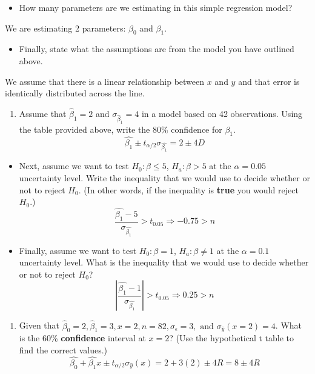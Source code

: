 \documentclass[
]{article}
\providecommand{\tightlist}{%
  \setlength{\itemsep}{0pt}\setlength{\parskip}{0pt}}
\begin{document}
\begin{itemize}
\tightlist
\item
  How many parameters are we estimating in this simple regression model?
\end{itemize}

We are estimating 2 parameters: \(\beta_0\) and \(\beta_1\).

\begin{itemize}
\tightlist
\item
  Finally, state what the assumptions are from the model you have
  outlined above.
\end{itemize}

We assume that there is a linear relationship between \(x\) and \(y\)
and that error is identically distributed across the line.

\begin{enumerate}
\def\labelenumi{\arabic{enumi}.}
\setcounter{enumi}{2}
\tightlist
\item
  Assume that \(\hat{\beta}_1 = 2\) and \(\sigma_{\hat{\beta}_1} = 4\)
  in a model based on 42 observations. Using the table provided above,
  write the 80\% confidence for \(\beta_1\).
  \[\hat{\beta_1}\pm t_{\alpha/2}\sigma_{\hat{\beta_1}}=\boxed{2\pm4D}\]
\end{enumerate}

\begin{itemize}
\tightlist
\item
  Next, assume we want to test \(H_0: \beta \le 5\), \(H_a: \beta > 5\)
  at the \(\alpha = 0.05\) uncertainty level. Write the inequality that
  we would use to decide whether or not to reject \(H_0\). (In other
  words, if the inequality is \textbf{true} you would reject \(H_0\).)
  \[\frac{\hat{\beta_1}-5}{\sigma_{\hat{\beta_1}}}>t_{0.05}\Rightarrow\boxed{-0.75>n}\]
\item
  Finally, assume we want to test \(H_0: \beta = 1\),
  \(H_a: \beta \ne 1\) at the \(\alpha = 0.1\) uncertainty level. What
  is the inequality that we would use to decide whether or not to reject
  \(H_0\)?
  \[\left|\frac{\hat{\beta_1}-1}{\sigma_{\hat{\beta_1}}}\right|>t_{0.05}\Rightarrow\boxed{0.25>n}\]
\end{itemize}

\begin{enumerate}
\def\labelenumi{\arabic{enumi}.}
\setcounter{enumi}{3}
\tightlist
\item
  Given that
  \(\hat{\beta}_0 = 2, \hat{\beta}_1 = 3, x = 2, n = 82, \sigma_\epsilon = 3, \text{ and } \sigma_{\hat{y}}(x = 2) = 4\).
  What is the 60\% \textbf{confidence} interval at \(x = 2\)? (Use the
  hypothetical t table to find the correct values.)
  \[\hat{\beta_0}+\hat{\beta_1}x\pm t_{\alpha/2}\sigma_{\hat{y}}(x)=2+3(2)\pm4R=\boxed{8\pm4R}\]
\end{enumerate}
\end{document}
